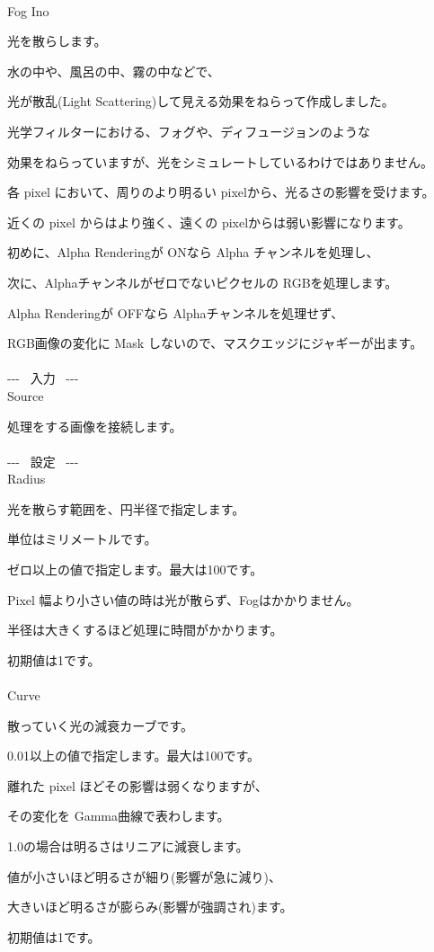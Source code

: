 \documentclass[a4paper,12pt]{article}
\begin{document}
\thispagestyle{empty}

\Large
\noindent \\
Fog Ino\medskip
\par
\normalsize
光を散らします。\\
\par
水の中や、風呂の中、霧の中などで、\par
光が散乱(Light Scattering)して見える効果をねらって作成しました。\par
光学フィルターにおける、フォグや、ディフュージョンのような\par
効果をねらっていますが、光をシミュレートしているわけではありません。\\
\par
各 pixel において、周りのより明るい pixelから、光るさの影響を受けます。\par
近くの pixel からはより強く、遠くの pixelからは弱い影響になります。\\
\par
初めに、\textquotedbl Alpha Rendering\textquotedbl が ONなら Alpha チャンネルを処理し、\par
次に、Alphaチャンネルがゼロでないピクセルの RGBを処理します。\\
\par
\textquotedbl Alpha Rendering\textquotedbl が OFFなら Alphaチャンネルを処理せず、\par
RGB画像の変化に Mask しないので、マスクエッジにジャギーが出ます。\\
\\
-{-}- \ 入力 \ -{-}-\\
Source\par
処理をする画像を接続します。\\
\\
-{-}- \ 設定 \ -{-}-\\
Radius\par
光を散らす範囲を、円半径で指定します。\par
単位はミリメートルです。\par
ゼロ以上の値で指定します。最大は100です。\par
Pixel 幅より小さい値の時は光が散らず、Fogはかかりません。\par
半径は大きくするほど処理に時間がかかります。\par
初期値は1です。\\
\\
Curve\par
散っていく光の減衰カーブです。\par
0.01以上の値で指定します。最大は100です。\par
離れた pixel ほどその影響は弱くなりますが、\par
その変化を Gamma曲線で表わします。\par
1.0の場合は明るさはリニアに減衰します。\par
値が小さいほど明るさが細り(影響が急に減り)、\par
大きいほど明るさが膨らみ(影響が強調され)ます。\par
初期値は1です。
\end{document}
